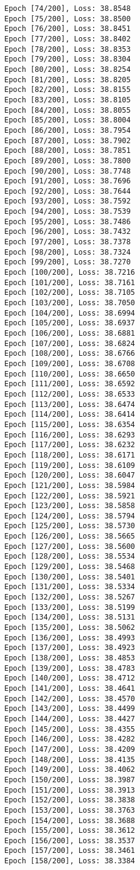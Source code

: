 \documentclass[11pt]{article}
\begin{document}
\begin{Verbatim}[commandchars=\\\{\}]
Epoch [74/200], Loss: 38.8548
Epoch [75/200], Loss: 38.8500
Epoch [76/200], Loss: 38.8451
Epoch [77/200], Loss: 38.8402
Epoch [78/200], Loss: 38.8353
Epoch [79/200], Loss: 38.8304
Epoch [80/200], Loss: 38.8254
Epoch [81/200], Loss: 38.8205
Epoch [82/200], Loss: 38.8155
Epoch [83/200], Loss: 38.8105
Epoch [84/200], Loss: 38.8055
Epoch [85/200], Loss: 38.8004
Epoch [86/200], Loss: 38.7954
Epoch [87/200], Loss: 38.7902
Epoch [88/200], Loss: 38.7851
Epoch [89/200], Loss: 38.7800
Epoch [90/200], Loss: 38.7748
Epoch [91/200], Loss: 38.7696
Epoch [92/200], Loss: 38.7644
Epoch [93/200], Loss: 38.7592
Epoch [94/200], Loss: 38.7539
Epoch [95/200], Loss: 38.7486
Epoch [96/200], Loss: 38.7432
Epoch [97/200], Loss: 38.7378
Epoch [98/200], Loss: 38.7324
Epoch [99/200], Loss: 38.7270
Epoch [100/200], Loss: 38.7216
Epoch [101/200], Loss: 38.7161
Epoch [102/200], Loss: 38.7105
Epoch [103/200], Loss: 38.7050
Epoch [104/200], Loss: 38.6994
Epoch [105/200], Loss: 38.6937
Epoch [106/200], Loss: 38.6881
Epoch [107/200], Loss: 38.6824
Epoch [108/200], Loss: 38.6766
Epoch [109/200], Loss: 38.6708
Epoch [110/200], Loss: 38.6650
Epoch [111/200], Loss: 38.6592
Epoch [112/200], Loss: 38.6533
Epoch [113/200], Loss: 38.6474
Epoch [114/200], Loss: 38.6414
Epoch [115/200], Loss: 38.6354
Epoch [116/200], Loss: 38.6293
Epoch [117/200], Loss: 38.6232
Epoch [118/200], Loss: 38.6171
Epoch [119/200], Loss: 38.6109
Epoch [120/200], Loss: 38.6047
Epoch [121/200], Loss: 38.5984
Epoch [122/200], Loss: 38.5921
Epoch [123/200], Loss: 38.5858
Epoch [124/200], Loss: 38.5794
Epoch [125/200], Loss: 38.5730
Epoch [126/200], Loss: 38.5665
Epoch [127/200], Loss: 38.5600
Epoch [128/200], Loss: 38.5534
Epoch [129/200], Loss: 38.5468
Epoch [130/200], Loss: 38.5401
Epoch [131/200], Loss: 38.5334
Epoch [132/200], Loss: 38.5267
Epoch [133/200], Loss: 38.5199
Epoch [134/200], Loss: 38.5131
Epoch [135/200], Loss: 38.5062
Epoch [136/200], Loss: 38.4993
Epoch [137/200], Loss: 38.4923
Epoch [138/200], Loss: 38.4853
Epoch [139/200], Loss: 38.4783
Epoch [140/200], Loss: 38.4712
Epoch [141/200], Loss: 38.4641
Epoch [142/200], Loss: 38.4570
Epoch [143/200], Loss: 38.4499
Epoch [144/200], Loss: 38.4427
Epoch [145/200], Loss: 38.4355
Epoch [146/200], Loss: 38.4282
Epoch [147/200], Loss: 38.4209
Epoch [148/200], Loss: 38.4135
Epoch [149/200], Loss: 38.4062
Epoch [150/200], Loss: 38.3987
Epoch [151/200], Loss: 38.3913
Epoch [152/200], Loss: 38.3838
Epoch [153/200], Loss: 38.3763
Epoch [154/200], Loss: 38.3688
Epoch [155/200], Loss: 38.3612
Epoch [156/200], Loss: 38.3537
Epoch [157/200], Loss: 38.3461
Epoch [158/200], Loss: 38.3384

\end{Verbatim}
\end{document}
